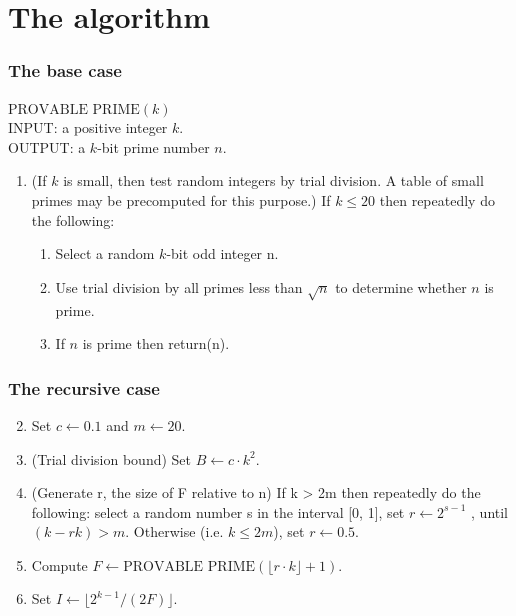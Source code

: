 \documentclass{beamer}
\begin{document}
\section{The algorithm}
\begin{frame}
\frametitle{The base case}
\noindent
$\text{PROVABLE PRIME}(k)$\\
INPUT: a positive integer $k$.\\
OUTPUT: a $k$-bit prime number $n$.
\begin{enumerate}
\item (If $k$ is small, then test random integers by trial division. A table of small primes may 
be precomputed for this purpose.) 
If $k \leq 20$ then repeatedly do the following: 
\begin{enumerate}
\item Select a random $k$-bit odd integer n. 
\item Use trial division by all primes less than $\sqrt{n}$ to determine whether $n$ is prime. 
\item If $n$ is prime then return(n).
\end{enumerate}
\end{enumerate}
\end{frame}
\begin{frame}
\frametitle{The recursive case}
\begin{enumerate}

  \setcounter{enumi}{1}
\item Set $c\leftarrow 0.1$ and $m\leftarrow 20$. 
\item (Trial division bound) Set $B\leftarrow c \cdot k^2$. 
\item (Generate r, the size of F relative to n) If k > 2m then repeatedly 
do the following: select a random number s in the interval [0, 1], set $r\leftarrow 2^{s-1}$ , until 
$(k - rk) > m$. Otherwise (i.e. $k \leq 2m$), set $r\leftarrow 0.5$. 
\item Compute $F\leftarrow \text{PROVABLE PRIME}(\lfloor r \cdot k \rfloor + 1)$. 
\item Set $I \leftarrow \lfloor 2^{k-1} /(2F) \rfloor$.
\end{enumerate} 
\end{frame}
\end{document}

